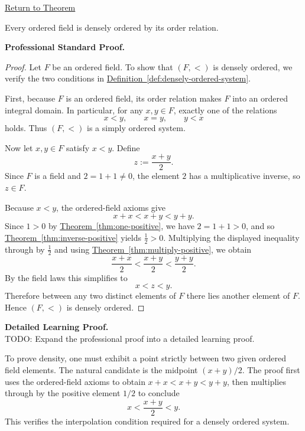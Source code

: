 \newpage
{}
\label{prf:ordered-fields-are-densely-ordered}

\begin{remark*}[Return]
\hyperref[thm:ordered-fields-are-densely-ordered]{Return to Theorem}
\end{remark*}

\begin{theorem*}
Every ordered field is densely ordered by its order relation.
\end{theorem*}

\textbf{Professional Standard Proof.}~\\
\begin{proof}
Let $F$ be an ordered field. To show that $(F,<)$ is densely ordered, we verify
the two conditions in
\hyperref[def:densely-ordered-system]{Definition~\ref*{def:densely-ordered-system}}.

First, because $F$ is an ordered field, its order relation makes $F$ into an
ordered integral domain. In particular, for any $x,y\in F$, exactly one of the
relations
\[
x<y,\qquad x=y,\qquad y<x
\]
holds. Thus $(F,<)$ is a simply ordered system.

Now let $x,y\in F$ satisfy $x<y$. Define
\[
z:=\frac{x+y}{2}.
\]
Since $F$ is a field and $2=1+1\neq 0$, the element $2$ has a multiplicative
inverse, so $z\in F$.

Because $x<y$, the ordered-field axioms give
\[
x+x<x+y<y+y.
\]
Since $1>0$ by
\hyperref[thm:one-positive]{Theorem~\ref*{thm:one-positive}}, we have
$2=1+1>0$, and so
\hyperref[thm:inverse-positive]{Theorem~\ref*{thm:inverse-positive}} yields
$\frac12>0$. Multiplying the displayed inequality through by $\frac12$ and using
\hyperref[thm:multiply-positive]{Theorem~\ref*{thm:multiply-positive}}, we obtain
\[
\frac{x+x}{2}<\frac{x+y}{2}<\frac{y+y}{2}.
\]
By the field laws this simplifies to
\[
x<z<y.
\]
Therefore between any two distinct elements of $F$ there lies another element
of $F$. Hence $(F,<)$ is densely ordered.
\end{proof}

\textbf{Detailed Learning Proof.}~\\
TODO: Expand the professional proof into a detailed learning proof.


\begin{remark*}
To prove density, one must exhibit a point strictly between two given ordered
field elements. The natural candidate is the midpoint $(x+y)/2$. The proof
first uses the ordered-field axioms to obtain $x+x<x+y<y+y$, then multiplies
through by the positive element $1/2$ to conclude
\[
x<\frac{x+y}{2}<y.
\]
This verifies the interpolation condition required for a densely ordered
system.
\end{remark*}


